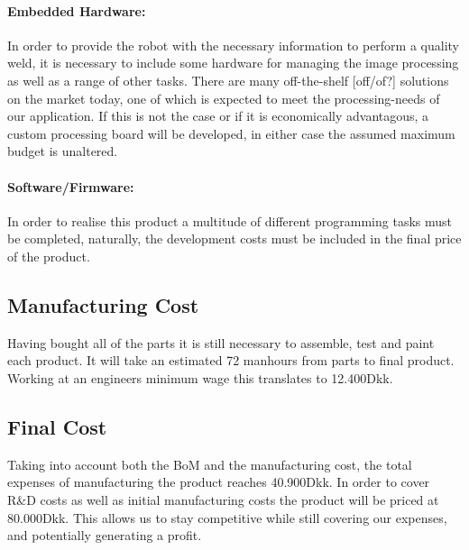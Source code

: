 \paragraph{Embedded Hardware:}
In order to provide the robot with the necessary information to perform a quality weld, it is necessary to include some hardware for managing the image processing as well as a range of other tasks. There are many off-the-shelf [off/of?] solutions on the market today, one of which is expected to meet the processing-needs of our application. If this is not the case or if it is economically advantagous, a custom processing board will be developed, in either case the assumed maximum budget is unaltered.
\paragraph{Software/Firmware:}
In order to realise this product a multitude of different programming tasks must be completed, naturally, the development costs must be included in the final price of the product.
\subsection{Manufacturing Cost}
Having bought all of the parts it is still necessary to assemble, test and paint each product. It will take an estimated 72 manhours from parts to final product. Working at an engineers minimum wage this translates to 12.400Dkk.
\subsection{Final Cost}
Taking into account both the BoM and the manufacturing cost, the total expenses of manufacturing the product reaches 40.900Dkk. In order to cover R\&D costs as well as initial manufacturing costs the product will be priced at 80.000Dkk. This allows us to stay competitive while still covering our expenses, and potentially generating a profit.